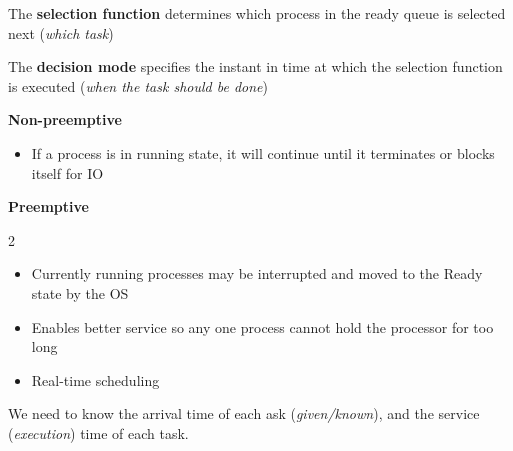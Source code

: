 \documentclass[a4paper,11pt]{article}
\begin{document}



The \textbf{selection function} determines which process in the ready queue is selected next (\emph{which task})\par



The \textbf{decision mode} specifies the instant in time at which the selection function is executed (\emph{when the task should be done})\par



\textbf{Non-preemptive}\par

\Needspace{28pt}
\begin{itemize}
\item If a process is in running state, it will continue until it terminates or blocks itself for IO
\end{itemize}



\textbf{Preemptive}\par

\Needspace{52pt}
\begin{multicols}{2}
\begin{itemize}
\item \begin{minipage}[t]{\linewidth}Currently running processes may be interrupted and moved to the Ready state by the OS\end{minipage}
\item \begin{minipage}[t]{\linewidth}Enables better service so any one process cannot hold the processor for too long\end{minipage}
\item \begin{minipage}[t]{\linewidth}Real-time scheduling\end{minipage}
\end{itemize}
\end{multicols}








We need to know the arrival time of each ask (\emph{given/known}), and the service (\emph{execution}) time of each task.\par
\end{document}
